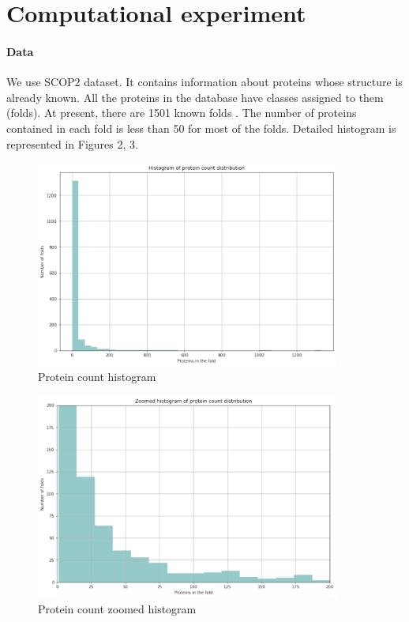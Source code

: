 \documentclass[12pt, twoside]{article}
\begin{document}
\section{Computational experiment}


\paragraph{Data}
\noindent
We use SCOP2 \cite{SCOP2FST, SCOP2SND} dataset. It contains information about proteins whose structure is already known. All the proteins in the database have classes assigned to them (folds).  At present, there are 1501 known folds \cite{SCOP2SND}. The number of proteins contained in each fold is less than 50 for most of the folds. Detailed histogram is represented in Figures 2, 3. 

\begin{figure}[htp]
    \centering
    \includegraphics[width=10cm]{figures/figure2.pdf}
    \caption{Protein count histogram}
\end{figure}

\begin{figure}[htp]
    \centering
    \includegraphics[width=10cm]{figures/figure3.pdf}
    \caption{Protein count zoomed histogram}
\end{figure}
\end{document}
